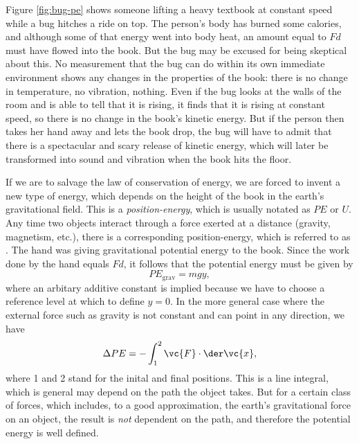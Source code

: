 

Figure \ref{fig:bug-pe} shows someone lifting a heavy textbook at constant speed while a bug hitches
a ride on top. The person's body has burned some calories, and although some of
that energy went into body heat, an amount equal to $Fd$ must have flowed into the
book. But the bug may be excused for being skeptical about this. No measurement that
the bug can do within its own immediate environment shows any changes in the properties
of the book: there is no change in temperature, no vibration, nothing.
Even if the bug looks at the walls of the room and is able to tell that it is rising,
it finds that it is rising at constant speed, so there is no change in the book's kinetic
energy. But if the person then takes her hand away and lets the book drop, the bug
will have to admit that there is a spectacular and scary release of kinetic energy,
which will later be transformed into sound and vibration when the book hits the floor.

If we are to salvage the law of conservation of energy, we are forced to invent a new
type of energy, which depends on the height of the book in the earth's gravitational
field. This is a \emph{position-energy}, which is usually notated as $PE$ or $U$.
Any time two objects interact through a force exerted at a distance (gravity, magnetism,
etc.), there is a corresponding position-energy, which is referred to as .
The hand was giving gravitational potential energy to the book. Since the work done by the
hand equals $Fd$, it follows that the potential energy must be given by
\begin{equation}
  PE_\text{grav} = mgy,
\end{equation}
where an arbitary additive constant is implied because we have to choose a reference level
at which to define $y=0$. In the more general case where the external force such as gravity
is not constant and can point in any direction, we have
\begin{equation}
  \Delta PE = -\int_1^2 \vc{F}\cdot\der\vc{x},
\end{equation}
where 1 and 2 stand for the inital and final positions. This is a line integral, which is general
may depend on the path the object takes. But for a certain class of forces, which includes, to a
good approximation, the earth's gravitational force on an object, the result is \emph{not}
dependent on the path, and therefore the potential energy is well defined.
